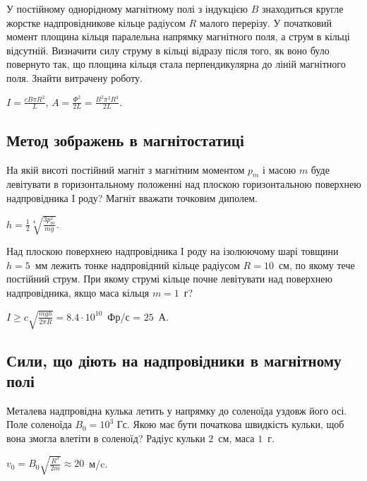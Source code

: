 \begin{problem}
У постійному однорідному магнітному полі з індукцією $B$ знаходиться кругле жорстке надпровідникове кільце радіусом $R$ малого перерізу. У початковий момент площина кільця паралельна напрямку магнітного поля, а струм в кільці відсутній. Визначити силу струму в кільці відразу після того, як воно було повернуто так, що площина кільця стала перпендикулярна до ліній магнітного поля. Знайти витрачену роботу.
\begin{solution}
	$I = \frac{cB\pi R^2}{L}$, $A = \frac{\Phi^2}{2L} = \frac{B^2\pi^2 R^4}{2L}$.
\end{solution}
\end{problem}

\subsection*{Метод зображень в магнітостатиці}
\begin{problem}
На якій висоті постійний магніт з магнітним моментом $p_m$ і масою $m$ буде левітувати в горизонтальному положенні над плоскою горизонтальною поверхнею надпровідника I роду? Магніт вважати точковим диполем.
\begin{solution}
	$h = \frac12 \sqrt[4]{\frac{3p_m^2}{mg}}$.
\end{solution}
\end{problem}

\begin{problem}
Над плоскою поверхнею надпровідника I роду на ізолюючому шарі товщини $h = 5$~мм лежить тонке надпровідний кільце радіусом $R = 10$~см, по якому тече постійний струм. При якому струмі кільце почне левітувати над поверхнею надпровідника, якщо маса кільця $m = 1$~г?
\begin{solution}
	$I \ge c \sqrt{\frac{mgh}{2\pi R}} = 8.4\cdot 10^{10}$~Фр/с = $25$~А.
\end{solution}
\end{problem}

\subsection*{Сили, що діють на надпровідники в магнітному полі}

\begin{problem} %
Металева надпровідна кулька летить у напрямку до соленоїда уздовж його осі. Поле соленоїда $B_0 = 10^3$ Гс. Якою має бути початкова швидкість кульки, щоб вона змогла влетіти в соленоїд? Радіус кульки $2$~см, маса $1$~г.
\begin{solution}
	$v_0 = B_0 \sqrt{\frac{R^3}{2m}} \approx 20$~м/c.
\end{solution}
\end{problem}

